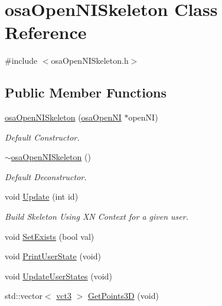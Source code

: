 \hypertarget{classosa_open_n_i_skeleton}{\section{osa\-Open\-N\-I\-Skeleton Class Reference}
\label{classosa_open_n_i_skeleton}
}


{\ttfamily \#include $<$osa\-Open\-N\-I\-Skeleton.\-h$>$}

\subsection*{Public Member Functions}
\begin{DoxyCompactItemize}
\item 
\hyperlink{classosa_open_n_i_skeleton_a5c40f05bc1f79ba5fb4f1c422ba89c86}{osa\-Open\-N\-I\-Skeleton} (\hyperlink{classosa_open_n_i}{osa\-Open\-N\-I} $\ast$open\-N\-I)
\begin{DoxyCompactList}\small\item\em Default Constructor. \end{DoxyCompactList}\item 
\hyperlink{classosa_open_n_i_skeleton_a2050d470948165695fb24d6079762785}{$\sim$osa\-Open\-N\-I\-Skeleton} ()
\begin{DoxyCompactList}\small\item\em Default Deconstructor. \end{DoxyCompactList}\item 
void \hyperlink{classosa_open_n_i_skeleton_a9c4d7f37c334b5566960387d1c54f29d}{Update} (int id)
\begin{DoxyCompactList}\small\item\em Build Skeleton Using X\-N Context for a given user. \end{DoxyCompactList}\item 
void \hyperlink{classosa_open_n_i_skeleton_a5a77d5f4cf38aec50a0c95bb2c5451ec}{Set\-Exists} (bool val)
\item 
void \hyperlink{classosa_open_n_i_skeleton_a2ef6e75c2c3886ef865816d2e1fd21e1}{Print\-User\-State} (void)
\item 
void \hyperlink{classosa_open_n_i_skeleton_a0fdd5a406a0d9146fddaed2ecf53840f}{Update\-User\-States} (void)
\item 
std\-::vector$<$ \hyperlink{vct_fixed_size_vector_types_8h_a3af82acdbf4eeb73c551909240b106ea}{vct3} $>$ \hyperlink{classosa_open_n_i_skeleton_ad23115daaef6472d50c62cfb4a736408}{Get\-Points3\-D} (void)
\end{DoxyCompactItemize}
